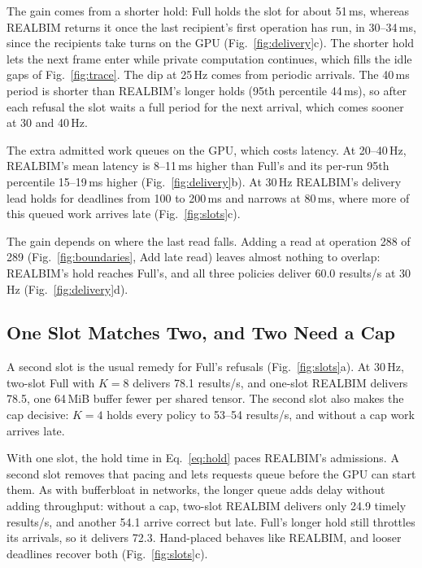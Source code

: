 \documentclass[conference]{IEEEtran}
\newcommand{\sys}{REALBIM}
\newcommand{\hps}{Hand-placed}
\newcommand{\MiB}{\,MiB}
\newcommand{\ms}{\,ms}
\newcommand{\Hz}{\,Hz}
\begin{document}
The gain comes from a shorter hold: Full holds the slot for about 51\ms, whereas \sys{} returns it once the last recipient's first operation has run, in 30--34\ms, since the recipients take turns on the GPU (Fig.~\ref{fig:delivery}c). The shorter hold lets the next frame enter while private computation continues, which fills the idle gaps of Fig.~\ref{fig:trace}. The dip at 25\Hz{} comes from periodic arrivals. The 40\ms{} period is shorter than \sys's longer holds (95th percentile 44\ms), so after each refusal the slot waits a full period for the next arrival, which comes sooner at 30 and 40\Hz.

The extra admitted work queues on the GPU, which costs latency. At 20--40\Hz, \sys's mean latency is 8--11\ms{} higher than Full's and its per-run 95th percentile 15--19\ms{} higher (Fig.~\ref{fig:delivery}b). At 30\Hz{} \sys's delivery lead holds for deadlines from 100 to 200\ms{} and narrows at 80\ms, where more of this queued work arrives late (Fig.~\ref{fig:slots}c).

\label{sec:eval-late}The gain depends on where the last read falls. Adding a read at operation 288 of 289 (Fig.~\ref{fig:boundaries}, Add late read) leaves almost nothing to overlap: \sys's hold reaches Full's, and all three policies deliver 60.0 results/s at 30\Hz{} (Fig.~\ref{fig:delivery}d).

\subsection{One Slot Matches Two, and Two Need a Cap}
\label{sec:eval-slots}

A second slot is the usual remedy for Full's refusals (Fig.~\ref{fig:slots}a). At 30\Hz, two-slot Full with $K{=}8$ delivers 78.1 results/s, and one-slot \sys{} delivers 78.5, one 64\MiB{} buffer fewer per shared tensor. The second slot also makes the cap decisive: $K{=}4$ holds every policy to 53--54 results/s, and without a cap work arrives late.

With one slot, the hold time in Eq.~\eqref{eq:hold} paces \sys's admissions. A second slot removes that pacing and lets requests queue before the GPU can start them. As with bufferbloat in networks, the longer queue adds delay without adding throughput: without a cap, two-slot \sys{} delivers only 24.9 timely results/s, and another 54.1 arrive correct but late. Full's longer hold still throttles its arrivals, so it delivers 72.3. \hps{} behaves like \sys, and looser deadlines recover both (Fig.~\ref{fig:slots}c).
\end{document}
